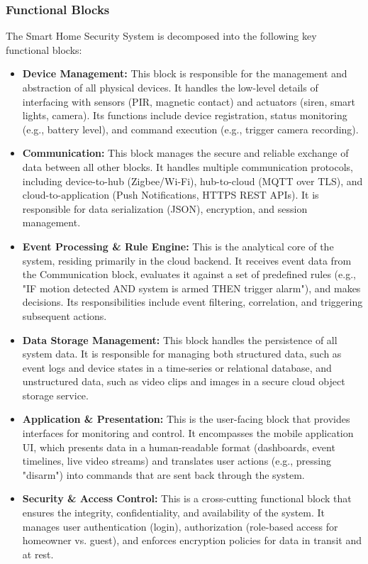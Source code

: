 \documentclass[conference]{IEEEtran}
\begin{document}
\subsubsection{Functional Blocks}
The Smart Home Security System is decomposed into the following key functional blocks:

\begin{itemize}
    \item \textbf{Device Management:} This block is responsible for the management and abstraction of all physical devices. It handles the low-level details of interfacing with sensors (PIR, magnetic contact) and actuators (siren, smart lights, camera). Its functions include device registration, status monitoring (e.g., battery level), and command execution (e.g., trigger camera recording).

    \item \textbf{Communication:} This block manages the secure and reliable exchange of data between all other blocks. It handles multiple communication protocols, including device-to-hub (Zigbee/Wi-Fi), hub-to-cloud (MQTT over TLS), and cloud-to-application (Push Notifications, HTTPS REST APIs). It is responsible for data serialization (JSON), encryption, and session management.

    \item \textbf{Event Processing \& Rule Engine:} This is the analytical core of the system, residing primarily in the cloud backend. It receives event data from the Communication block, evaluates it against a set of predefined rules (e.g., "IF motion detected AND system is armed THEN trigger alarm"), and makes decisions. Its responsibilities include event filtering, correlation, and triggering subsequent actions.

    \item \textbf{Data Storage Management:} This block handles the persistence of all system data. It is responsible for managing both structured data, such as event logs and device states in a time-series or relational database, and unstructured data, such as video clips and images in a secure cloud object storage service.

    \item \textbf{Application \& Presentation:} This is the user-facing block that provides interfaces for monitoring and control. It encompasses the mobile application UI, which presents data in a human-readable format (dashboards, event timelines, live video streams) and translates user actions (e.g., pressing "disarm") into commands that are sent back through the system.

    \item \textbf{Security \& Access Control:} This is a cross-cutting functional block that ensures the integrity, confidentiality, and availability of the system. It manages user authentication (login), authorization (role-based access for homeowner vs. guest), and enforces encryption policies for data in transit and at rest.
\end{itemize}
\end{document}

